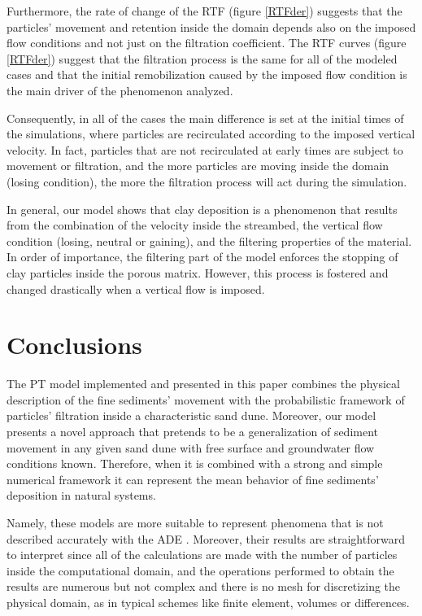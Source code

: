 \documentclass[draft,linenumbers]{agujournal2018}
\begin{document}
Furthermore, the rate of change of the RTF (figure \ref{RTFder}) suggests that the particles' movement and retention inside the domain depends also on the imposed flow conditions and not just on the filtration coefficient. The RTF curves (figure \ref{RTFder}) suggest that the filtration process is the same for all of the modeled cases and that the initial remobilization caused by the imposed flow condition is the main driver of the phenomenon analyzed. 

Consequently, in all of the cases the main difference is set at the initial times of the simulations, where particles are recirculated according to the imposed vertical velocity. In fact, particles that are not recirculated at early times are subject to movement or filtration, and the more particles are moving inside the domain (losing condition), the more the filtration process will act during the simulation. 

In general, our model shows that clay deposition is a phenomenon that results from the combination of the velocity inside the streambed, the vertical flow condition (losing, neutral or gaining), and the filtering properties of the material. In order of importance, the filtering part of the model enforces the stopping of clay particles inside the porous matrix. However, this process is fostered and changed drastically when a vertical flow is imposed. 

\section{Conclusions} \label{Conclusions}

The PT model implemented and presented in this paper combines the physical description of the fine sediments' movement with the probabilistic framework of particles' filtration inside a characteristic sand dune. Moreover, our model presents a novel approach that pretends to be a generalization of sediment movement in any given sand dune with free surface and groundwater flow conditions known. Therefore, when it is combined with a strong and simple numerical framework it can represent the mean behavior of fine sediments' deposition in natural systems. 

Namely, these models are more suitable to represent phenomena that is not described accurately with the ADE \citep{Noetinger2016}. Moreover, their results are straightforward to interpret since all of the calculations are made with the number of particles inside the computational domain, and the operations performed to obtain the results are numerous but not complex and there is no mesh for discretizing the physical domain, as in typical schemes like finite element, volumes or differences.
\end{document}
